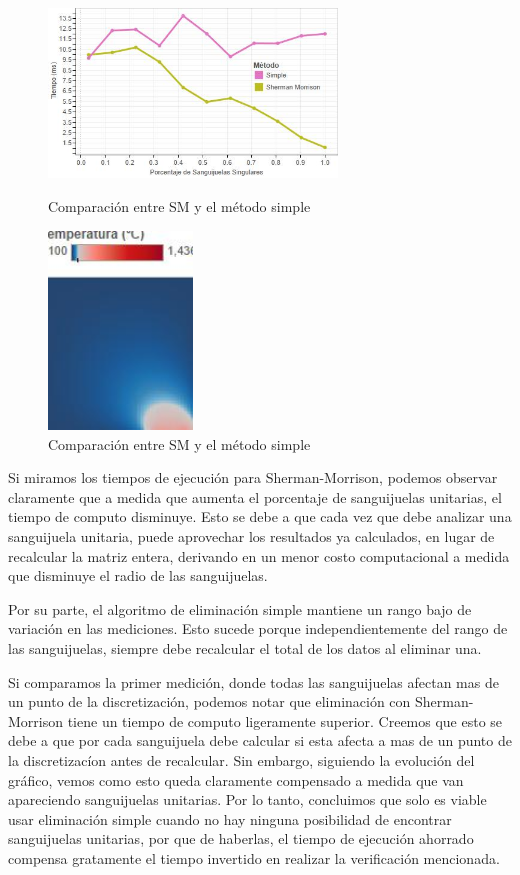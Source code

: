 \begin{figure}[h]
    \centering
    \includegraphics[width=0.685\textwidth]{experimento 3-1}
    \caption{Comparación entre SM y el método simple}
    \label{fig:exp31}
    
    \includegraphics[width=0.3425\textwidth]{Ejemplo SM}
    \caption{Comparación entre SM y el método simple}
    \label{fig:exp31-vis}
\end{figure}

Si miramos los tiempos de ejecución para Sherman-Morrison, podemos observar claramente que a medida que aumenta el porcentaje de sanguijuelas unitarias, el tiempo de computo disminuye. Esto se debe a que cada vez que debe analizar una sanguijuela unitaria, puede aprovechar los resultados ya calculados, en lugar de recalcular la matriz entera, derivando en un menor costo computacional a medida que disminuye el radio de las sanguijuelas.

Por su parte, el algoritmo de eliminación simple mantiene un rango bajo de variación en las mediciones. Esto sucede porque independientemente del rango de las sanguijuelas, siempre debe recalcular el total de los datos al eliminar una. 

Si comparamos la primer medición, donde todas las sanguijuelas afectan mas de un punto de la discretizaci\'on, podemos notar que eliminación con Sherman-Morrison tiene un tiempo de computo ligeramente superior. Creemos que esto se debe a que por cada sanguijuela debe calcular si esta afecta a mas de un punto de la discretizac\'ion antes de recalcular. Sin embargo, siguiendo la evolución del gráfico, vemos como esto queda claramente compensado a medida que van apareciendo sanguijuelas unitarias. Por lo tanto, concluimos que solo es viable usar eliminación simple cuando no hay 
ninguna posibilidad de encontrar sanguijuelas unitarias, por que de haberlas, el tiempo de ejecución ahorrado compensa gratamente el tiempo invertido en realizar la verificación mencionada. 
